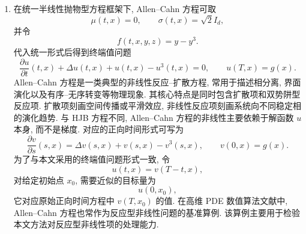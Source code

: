\begin{enumerate}
        \item
        在统一半线性抛物型方程框架下, Allen--Cahn 方程可取
        \begin{equation*}
          \mu(t, x) = 0,\qquad
          \sigma(t, x) = \sqrt{2} I_{d},
        \end{equation*}
        并令
        \begin{equation*}
          f(t, x, y, z) = y - y^{3}.
        \end{equation*}
        代入统一形式后得到终端值问题
        \begin{equation*}
          \frac{\partial u}{\partial t}(t, x)
          + \Delta u(t, x)
          + u(t, x) - u^{3}(t, x)
          = 0,
          \qquad
          u(T, x) = g(x).
        \end{equation*}
        Allen--Cahn 方程是一类典型的非线性反应--扩散方程, 常用于描述相分离, 界面演化以及有序--无序转变等物理现象.
        其核心特点是同时包含扩散项和双势阱型反应项.
        扩散项刻画空间传播或平滑效应, 非线性反应项刻画系统向不同稳定相的演化趋势.
        与 HJB 方程不同, Allen--Cahn 方程的非线性主要依赖于解函数 $u$ 本身, 而不是梯度.
        对应的正向时间形式可写为
        \begin{equation*}
          \frac{\partial v}{\partial s}(s, x) = \Delta v(s,x) + v(s,x) - v^3(s,x),
          \qquad
          v(0, x) = g(x).
        \end{equation*}
        为了与本文采用的终端值问题形式一致, 令
        \begin{equation*}
          u(t, x) = v(T-t, x),
        \end{equation*}
        对给定初始点 $x_0$, 需要近似的目标量为
        \begin{equation*}
          u(0, x_0),
        \end{equation*}
        它对应原始正向时间方程中 $v(T, x_0)$ 的值.
        在高维 PDE 数值算法文献中, Allen--Cahn 方程也常作为反应型非线性问题的基准算例\cite{hanSolvingHighdimensionalPartial2018,eAlgorithmsSolvingHigh2022}.
        该算例主要用于检验本文方法对反应型非线性项的处理能力.


\end{enumerate}
